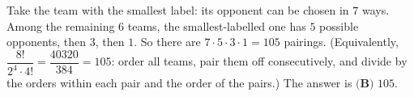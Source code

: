 Take the team with the smallest label: its opponent can be chosen in $7$ ways. Among the remaining $6$ teams, the smallest-labelled one has $5$ possible opponents, then $3$, then $1$. So there are $7\cdot5\cdot3\cdot1=105$ pairings. (Equivalently, $\dfrac{8!}{2^4\cdot4!}=\dfrac{40320}{384}=105$: order all teams, pair them off consecutively, and divide by the orders within each pair and the order of the pairs.) The answer is $\boxed{\textbf{(B) }105}$.
